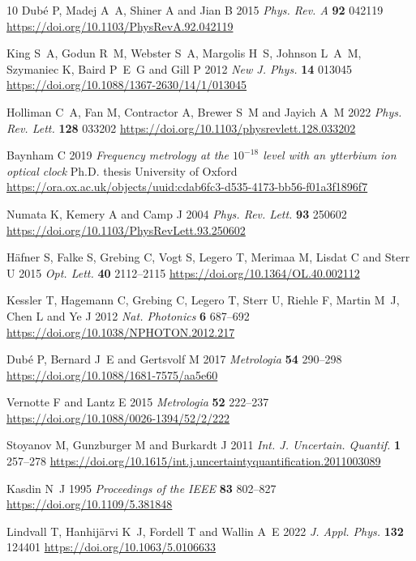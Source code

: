 \documentclass[10pt,a4paper]{iopart}
\begin{document}
\begin{thebibliography}{10}
Dub\'e P, Madej A~A, Shiner A and Jian B 2015 {\em Phys. Rev. A\/} {\bf 92}
  042119 \urlprefix\url{https://doi.org/10.1103/PhysRevA.92.042119}

King S~A, Godun R~M, Webster S~A, Margolis H~S, Johnson L~A~M, Szymaniec K,
  Baird P~E~G and Gill P 2012 {\em New J. Phys.\/} {\bf 14} 013045
  \urlprefix\url{https://doi.org/10.1088/1367-2630/14/1/013045}

Holliman C~A, Fan M, Contractor A, Brewer S~M and Jayich A~M 2022 {\em Phys.
  Rev. Lett.\/} {\bf 128} 033202
  \urlprefix\url{https://doi.org/10.1103/physrevlett.128.033202}

Baynham C 2019 {\em Frequency metrology at the $10^{-18}$ level with an
  ytterbium ion optical clock\/} Ph.D. thesis University of Oxford
  \urlprefix\url{https://ora.ox.ac.uk/objects/uuid:cdab6fc3-d535-4173-bb56-f01a3f1896f7}

Numata K, Kemery A and Camp J 2004 {\em Phys. Rev. Lett.\/} {\bf 93} 250602
  \urlprefix\url{https://doi.org/10.1103/PhysRevLett.93.250602}

H\"afner S, Falke S, Grebing C, Vogt S, Legero T, Merimaa M, Lisdat C and Sterr
  U 2015 {\em Opt. Lett.\/} {\bf 40} 2112--2115
  \urlprefix\url{https://doi.org/10.1364/OL.40.002112}

Kessler T, Hagemann C, Grebing C, Legero T, Sterr U, Riehle F, Martin M~J, Chen
  L and Ye J 2012 {\em Nat. Photonics\/} {\bf 6} 687--692
  \urlprefix\url{https://doi.org/10.1038/NPHOTON.2012.217}

Dub\'e P, Bernard J~E and Gertsvolf M 2017 {\em Metrologia\/} {\bf 54} 290--298
  \urlprefix\url{https://doi.org/10.1088/1681-7575/aa5e60}

Vernotte F and Lantz E 2015 {\em Metrologia\/} {\bf 52} 222--237
  \urlprefix\url{https://doi.org/10.1088/0026-1394/52/2/222}

Stoyanov M, Gunzburger M and Burkardt J 2011 {\em Int. J. Uncertain.
  Quantif.\/} {\bf 1} 257--278
  \urlprefix\url{https://doi.org/10.1615/int.j.uncertaintyquantification.2011003089}

Kasdin N~J 1995 {\em Proceedings of the IEEE\/} {\bf 83} 802--827
  \urlprefix\url{https://doi.org/10.1109/5.381848}

Lindvall T, Hanhij\"arvi K~J, Fordell T and Wallin A~E 2022 {\em J. Appl.
  Phys.\/} {\bf 132} 124401 \urlprefix\url{https://doi.org/10.1063/5.0106633}


\end{thebibliography}
\end{document}
